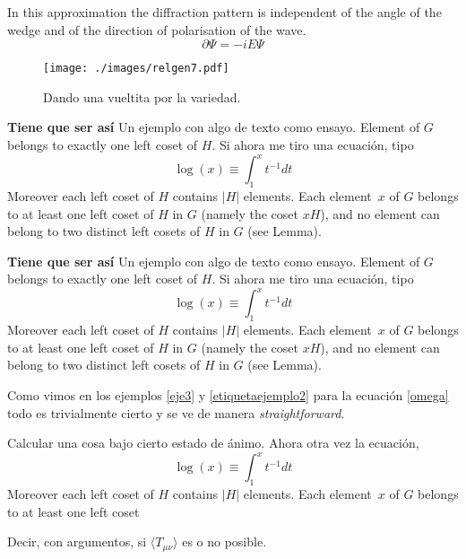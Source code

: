 \documentclass[10pt,oneside]{CBFT_article}
\begin{document}
In this approximation the diffraction pattern is independent of the angle of the wedge
and of the direction of polarisation of the wave.
\[ \partial \Psi = -iE\Psi \]

\lipsum[3]

\begin{figure}[ht]
\centering
\texttt{[image: ./images/relgen7.pdf]} 
\caption{Dando una vueltita por la variedad.} \label{fig_coord_norm}
\end{figure}

\lipsum[2]

\begin{ejemplillo}{\bf Tiene que ser así}
Un ejemplo con algo de texto como ensayo. Element of $G$ belongs to exactly one left coset of 
$H$. Si ahora me tiro una ecuación, tipo
\[ \log(x)\equiv \int_1^x t^{-1}dt\]
Moreover each left coset of $H$ contains $|H|$ elements. Each element~$x$ of $G$ belongs to at 
least one left coset of $H$ in $G$ (namely the coset $xH$), and no element can belong to two 
distinct left cosets of $H$ in $G$ (see Lemma).
\label{etiquetaejemplo2}
\end{ejemplillo}

\lipsum[1]


\begin{ejemplillo}{\bf Tiene que ser así}
Un ejemplo con algo de texto como ensayo. Element of $G$ belongs to exactly one left coset of 
$H$. Si ahora me tiro una ecuación, tipo
\[ \log(x)\equiv \int_1^x t^{-1}dt\]
Moreover each left coset of $H$ contains $|H|$ elements. Each element~$x$ of $G$ belongs to at 
least one left coset of $H$ in $G$ (namely the coset $xH$), and no element can belong to two 
distinct left cosets of $H$ in $G$ (see Lemma).
\label{eje3}
\end{ejemplillo}

Como vimos en los ejemplos \eqref{eje3} y \eqref{etiquetaejemplo2} para la ecuación 
\eqref{omega} todo es trivialmente cierto y se ve de manera {\it straightforward}.

\begin{problemas}
	\item Calcular una cosa bajo cierto estado de ánimo.
Ahora otra vez la ecuación,
	\[ \log(x)\equiv \int_1^x t^{-1}dt\]
	Moreover each left coset of $H$ contains $|H|$ elements. Each 
	element~$x$ of $G$ belongs to at least one left coset
	\item Decir, con argumentos, si $\langle T_{\mu\nu}\rangle$ es o no posible. 
\end{problemas}
\end{document}
